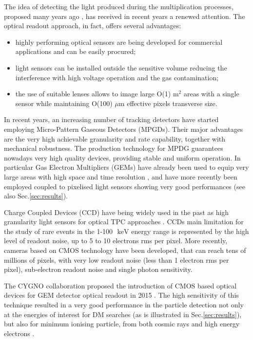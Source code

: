 \documentclass[physics,article,submit,moreauthors,pdftex]{Definitions/mdpi}
\newcommand{\keV}{\ensuremath{\,\textrm{keV}}\xspace}
\begin{document}
The idea of detecting the light produced during the multiplication processes, proposed many years ago \cite{bib:charpak}, has received in recent years a renewed attention. The optical readout approach, in fact, offers several advantages:
\begin{itemize}
\item highly performing optical sensors are being developed for commercial applications and can be easily procured;
\item light sensors can be installed outside the sensitive volume reducing the interference with high voltage operation and the gas contamination;
\item the use of suitable lenses allows to image large O(1) m$^2$ areas with a single sensor while maintaining O(100) $\mu$m effective pixels transverse size.
\end{itemize}

In recent years, an increasing number of tracking detectors have started employing 
Micro-Pattern Gaseous Detectors (MPGDs). Their major advantages are the very high achievable granularity and rate capability, together with mechanical robustness. The production technology for MPDG guarantees nowadays very high quality devices, providing stable and uniform operation. In particular Gas Electron Multipliers (GEMs) \cite{bib:gem} have already been used to equip very large areas with high space and time resolution \cite{bib:alice}, and have more recently been employed coupled to pixelised light sensors showing very good performances \cite{bib:ref1, bib:jinst_orange1, bib:loomba, bib:Fraga} (see also Sec.\ref{sec:results}). 

Charge Coupled Devices (CCD) have being widely used in the past as high granularity light sensors for optical TPC approaches \citep{bib:ccd1, bib:loomba, bib:ccd2}. CCDs main limitation for the study of rare events in the 1-100~\keV energy range is represented by the high level of readout noise, up to 5 to 10 electrons rms per pixel. More recently, cameras based on CMOS technology have been developed, that can reach tens of millions of pixels, with very low readout noise (less than 1 electron rms per pixel), sub-electron readout noise and single photon sensitivity. 

The CYGNO collaboration proposed the introduction of CMOS based optical devices for GEM detector optical readout in 2015  \cite{bib:nim_orange1}. The high sensitivity of this technique resulted in a very good performance in the particle detection not only at the energies of interest for DM searches (as is illustrated in Sec.\ref{sec:results}), but also for minimum ionising particle, from both cosmic rays and high energy electrons  \cite{ bib:jinst_orange1, bib:jinst_orange2, bib:ieee_orange, bib:elba, bib:lemon_btf}. 
\end{document}
